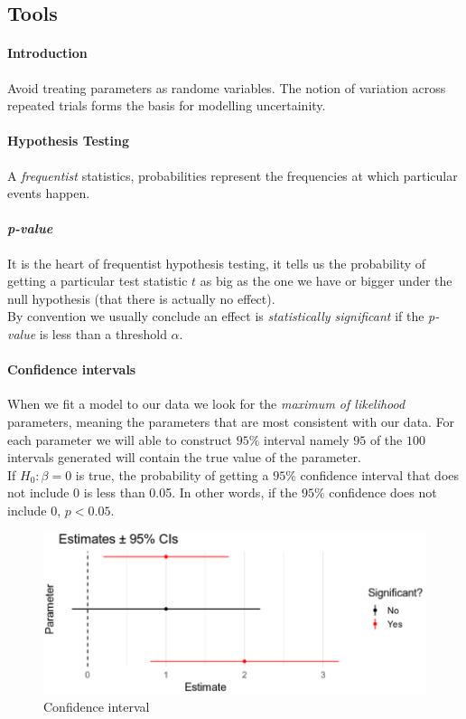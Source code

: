 \subsection{Tools}
\paragraph{Introduction}
Avoid treating parameters as randome variables.
The notion of variation across repeated trials forms the basis for modelling
uncertainity.


\paragraph{Hypothesis Testing}
A \emph{frequentist} statistics, probabilities represent the frequencies at which 
particular events happen.

\paragraph{\emph{p-value}}
It is the heart of frequentist hypothesis testing, it tells us the probability of getting
a particular test statistic $t$ as big as the one we have or bigger under the null 
hypothesis (that there is actually no effect).\\
By convention we usually conclude an effect is \emph{statistically significant} if the 
\emph{p-value} is less than a threshold $\alpha$.

\paragraph{Confidence intervals}
When we fit a model to our data we look for the \emph{maximum of likelihood} parameters,
meaning the parameters that are most consistent with our data. 
For each parameter we will able to construct $95\%$ interval namely $95$ of the $100$ 
intervals generated will contain the true value of the parameter.\\
If $H_{0}: \beta=0$ is true, the probability of getting a $95\%$ confidence interval that
does not include 0 is less than 0.05. In other words, if the $95\%$ confidence does not 
include 0, $p<0.05$.
\begin{figure}[H]
	\begin{center}
		\includegraphics[width=\textwidth]{./chaps/10sec/images/4_estimates.png}
	\end{center}
	\caption{Confidence interval}
	\label{fig:4_estimates}
\end{figure}

